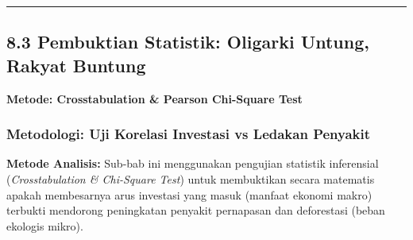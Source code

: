 \documentclass[
]{article}
\begin{document}
\begin{center}\rule{0.5\linewidth}{0.5pt}\end{center}

\subsection{8.3 Pembuktian Statistik: Oligarki Untung, Rakyat
Buntung}\label{pembuktian-statistik-oligarki-untung-rakyat-buntung}

\textbf{Metode: Crosstabulation \& Pearson Chi-Square Test}

\subsubsection{Metodologi: Uji Korelasi Investasi vs Ledakan
Penyakit}\label{metodologi-uji-korelasi-investasi-vs-ledakan-penyakit}

\textbf{Metode Analisis:} Sub-bab ini menggunakan pengujian statistik
inferensial (\emph{Crosstabulation \& Chi-Square Test}) untuk
membuktikan secara matematis apakah membesarnya arus investasi yang
masuk (manfaat ekonomi makro) terbukti mendorong peningkatan penyakit
pernapasan dan deforestasi (beban ekologis mikro).
\end{document}
